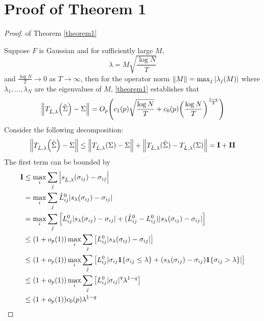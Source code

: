 \section{Proof of Theorem 1}
\begin{proof}{ of Theorem \ref{theorem1}}

    Suppose \(F\) is Gaussian and for sufficiently large \(M\), 
    \begin{equation*}
            \lambda = M \sqrt{\frac{\log N}{T}}
    \end{equation*}
    and \(\frac{\log N}{T} \to 0\) as \(T \to \infty\), 
    then for the operator norm \(\norm{M}= \max_{j} \abs{\lambda_{j}(M)}\) where \(\lambda_{1},\dots,\lambda_{N}\) are the eigenvalues of \(M\), \autoref{theorem1} establishes that
        \begin{equation*}
      \norm{T_{\hat{L},\lambda}\pqty{\hat{\Sigma}} - \Sigma } = O_{p}\pqty{c_{1}(p) \sqrt{\frac{\log N}{T}}+c_{0}(p)\pqty{\frac{\log N}{T}}^{\frac{1-q}{2}}}
       \end{equation*}
    Consider the following decomposition:
    \begin{equation*}
        \norm{T_{\hat{L},\lambda}\pqty{\hat{\Sigma}} - \Sigma } \leq \norm{T_{\hat{L} ,\lambda}(\Sigma) - \Sigma} +\norm{T_{\hat{L}, \lambda}(\hat{\Sigma}) - T_{\hat{L},\lambda}(\Sigma)} = \mathbf{I} + \mathbf{II}
    \end{equation*}
    The first term can be bounded by 
    \begin{align*}
        \mathbf{I} &\leq \max_{i} \sum_{j} \abs{s_{\hat{L}, \lambda}(\sigma_{ij}) - \sigma_{ij}} \\
        &= \max_{i} \sum_{j} \hat{L}_{ij}^{0} \abs{s_{\lambda}(\sigma_{ij}) - \sigma_{ij}}\\
        &= \max_{i} \sum_{j} \bqty{L_{ij}^{0} \abs{s_{\lambda}(\sigma_{ij}) - \sigma_{ij}} + (\hat{L}_{ij}^{0} - L_{ij}^{0})\abs{s_{\lambda}(\sigma_{ij}) - \sigma_{ij}}} \\
        &\leq (1 + o_{p}(1))\max_{i} \sum_{j} \bqty{L_{ij}^{0} \abs{s_{\lambda}(\sigma_{ij}) - \sigma_{ij}}}\\
        &\leq (1 + o_{p}(1))\max_{i} \sum_{j} \bqty{L_{ij}^{0} \abs{\sigma_{ij} \mathbf{1}\Bqty{\sigma_{ij}\leq \lambda} + (s_{\lambda}(\sigma_{ij}) - \sigma_{ij}) \mathbf{1}\Bqty{\sigma_{ij} > \lambda}}}\\
        &\leq (1 + o_{p}(1)) \max_{i} \sum_{j} \bqty{L_{ij}^{0}\abs{\sigma_{ij}}^{q} \lambda^{1 -q}}\\
        &\leq (1 + o_{p}(1)) c_{0}(p) \lambda^{1-q}

\end{align*}
\end{proof}
